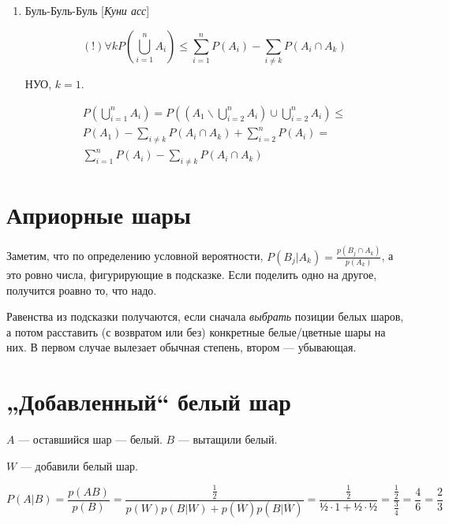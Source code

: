 \documentclass[12pt, a4paper]{article}
\begin{document}
\begin{enumerate}
    \item Буль-Буль-Буль [\textit{Куни асс}]
    
    \begin{equation}
        (!) \forall k P\left(\bigcup_{i=1}^n A_i\right) \leqslant \sum_{i=1}^n P\left(A_i\right) - \sum_{i \neq k} P\left(A_i \cap A_k\right)
    \end{equation}

    НУО, $k = 1$. 


    \begin{multline}
        P\left(\bigcup_{i=1}^n A_i\right) = P\left(\left(A_1 \backslash \bigcup_{i=2}^n A_i \right) \cup \bigcup_{i=2}^n A_i\right) \leqslant \\
        P(A_1) - \sum_{i \neq k} P\left(A_i \cap A_k\right) + \sum_{i=2}^n P\left(A_i\right) = \\
        \sum_{i=1}^n P\left(A_i\right) - \sum_{i \neq k} P\left(A_i \cap A_k\right)
    \end{multline}
\end{enumerate}

\section{Априорные шары}

Заметим, что по определению условной вероятности, $P(B_j | A_k) = \frac{p(B_j \cap A_k)}{p(A_k)}$,
а это ровно числа, фигурирующие в подсказке. Если поделить одно на другое, получится роавно то, что надо.

Равенства из подсказки получаются, если сначала \textit{выбрать} позиции белых шаров,
а потом расставить (с возвратом или без) конкретные белые/цветные шары на них.
В первом случае вылезает обычная степень, втором — убывающая.


\section{„Добавленный“ белый шар}

$A$ — оставшийся шар — белый.
$B$ — вытащили белый.

$W$ — добавили белый шар.

\begin{equation}
    P(A | B) = \frac{p(AB)}{p(B)} = \frac{\frac{1}{2}}{p(W)p(B | W) + p(\overline{W})p(B | \overline{W})} =
    \frac{\frac{1}{2}}{½ \cdot 1 + ½\cdot ½} = \frac{\frac{1}{2}}{\frac 34} = \frac 46 = \frac 23
\end{equation}
\end{document}
